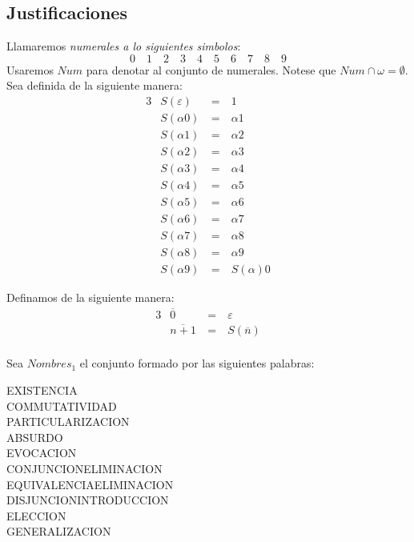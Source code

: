 \subsection{Justificaciones}
\begin{definition}
  Llamaremos \emph{numerales a lo siguientes simbolos}:
  $$
  0\quad1\quad2\quad3\quad4\quad5\quad6\quad7\quad8\quad9
  $$
  Usaremos $Num$ para denotar al conjunto de numerales. Notese que $Num\cap\omega=\emptyset$. Sea  definida de la siguiente manera:
  \begin{alignat*}{3}
    &S(\varepsilon) &\ =&\  1\\
    &S(\alpha0) &\ =&\ \alpha1\\
    &S(\alpha1) &\ =&\ \alpha2\\
    &S(\alpha2) &\ =&\ \alpha3\\
    &S(\alpha3) &\ =&\ \alpha4\\
    &S(\alpha4) &\ =&\ \alpha5\\
    &S(\alpha5) &\ =&\ \alpha6\\
    &S(\alpha6) &\ =&\ \alpha7\\
    &S(\alpha7) &\ =&\ \alpha8\\
    &S(\alpha8) &\ =&\ \alpha9\\
    &S(\alpha9) &\ =&\ S(\alpha)0
  \end{alignat*}

  Definamos  de la siguiente manera:
  \begin{alignat*}{3}
    &\overline{0} &\ =&\  \varepsilon\\
    &\overline{n+1} &\ =&\ S(\overline{n})\\    
  \end{alignat*}

  Sea $Nombres_1$ el conjunto formado por las siguientes palabras:
  \begin{center}
    EXISTENCIA\\
    COMMUTATIVIDAD\\
    PARTICULARIZACION\\
    ABSURDO\\
    EVOCACION\\
    CONJUNCIONELIMINACION\\
    EQUIVALENCIAELIMINACION\\
    DISJUNCIONINTRODUCCION\\
    ELECCION\\
    GENERALIZACION\\
  \end{center}


\end{definition}

